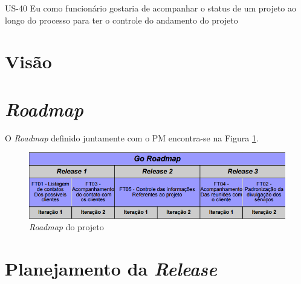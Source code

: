 US-40 Eu como funcionário gostaria de acompanhar o status de um projeto ao longo do processo para ter o controle do andamento do projeto


\section{Visão}

\section{\textit{Roadmap}}

O \textit{Roadmap} definido juntamente com o PM encontra-se na Figura \ref{roadmap}.

\begin{figure}[!htb]
\centering
\includegraphics[scale=0.6]{figuras/roadmap.png}
\caption{\textit{Roadmap} do projeto}
\label{roadmap}
\end{figure}

\section{Planejamento da \textit{Release}}